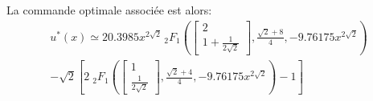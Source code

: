 La commande optimale associée est alors:
\begin{equation}\label{optimal_control_4}
    \begin{aligned}
        u^*(x)\simeq20.3985 x^{2 \sqrt{2}} \, _2F_1\left(\begin{bmatrix}2\\1+\frac{1}{2 \sqrt{2}}\end{bmatrix},\frac{\sqrt{2}+8}{4},-9.76175 x^{2 \sqrt{2}}\right)\\-\sqrt{2} \left[2 \; _2F_1\left(\begin{bmatrix}1\\\frac{1}{2 \sqrt{2}}\end{bmatrix},\frac{\sqrt{2}+4}{4} ,-9.76175 x^{2 \sqrt{2}}\right)-1\right]     
    \end{aligned}
\end{equation}
